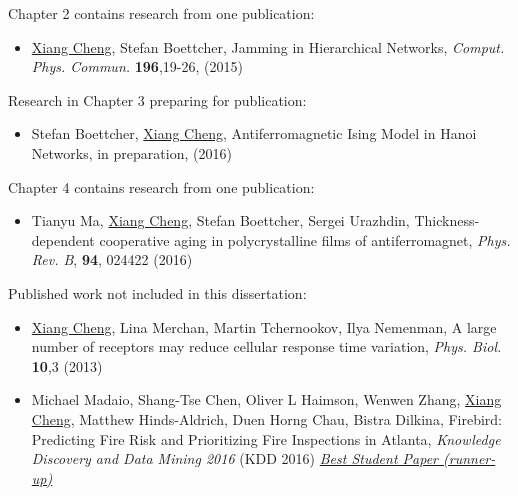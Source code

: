 \begin{prev_citation}
\noindent Chapter 2 contains research from one publication:
\begin{itemize}
\item \underline{Xiang Cheng}, Stefan Boettcher, Jamming in Hierarchical Networks, {\it Comput. Phys. Commun.} {\bf 196},19-26, (2015)
\end{itemize}

\noindent Research in Chapter 3 preparing for publication:
\begin{itemize}
\item Stefan Boettcher,  \underline{Xiang Cheng}, Antiferromagnetic Ising Model in Hanoi Networks, in preparation, (2016)
\end{itemize}

\noindent Chapter 4 contains research from one publication:
\begin{itemize}
\item  Tianyu Ma, \underline{Xiang Cheng}, Stefan Boettcher, Sergei Urazhdin, Thickness-dependent cooperative aging in polycrystalline films of antiferromagnet, {\it Phys. Rev. B},   {\bf 94}, 024422 (2016)
\end{itemize}


\noindent Published work not included in this dissertation:
\begin{itemize}
\item  \underline{Xiang Cheng}, Lina Merchan, Martin Tchernookov, Ilya Nemenman, A large number of receptors may reduce cellular response time variation, {\it Phys. Biol.}  {\bf 10},3 (2013)

\item  Michael Madaio, Shang-Tse Chen, Oliver L Haimson, Wenwen Zhang, \underline{Xiang Cheng}, Matthew Hinds-Aldrich, Duen Horng Chau, Bistra Dilkina, Firebird: Predicting Fire Risk and Prioritizing Fire Inspections in Atlanta, {\it  Knowledge Discovery and Data Mining 2016} (KDD 2016) \underline{\it Best Student Paper (runner-up)}
\end{itemize}

\end{prev_citation}

\pagestyle{fancy}
